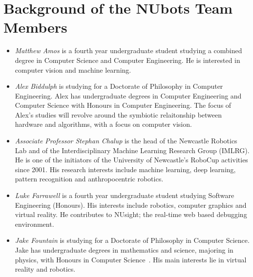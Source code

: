 \documentclass{llncs}
\begin{document}

\section{Background of the NUbots Team Members}

\begin{itemize}


\item \emph{Matthew Amos} is a fourth year undergraduate student studying a combined degree in Computer Science and Computer Engineering. He is interested in computer vision and machine learning.

\item \emph{Alex Biddulph} is studying for a Doctorate of Philosophy in Computer Engineering. Alex has undergraduate degrees in Computer Engineering and Computer Science with Honours in Computer Engineering. The focus of Alex's studies will revolve around the symbiotic relaitonship between hardware and algorithms, with a focus on computer vision.

\item \emph{Associate Professor Stephan Chalup} is the head of the Newcastle Robotics Lab and of the Interdisciplinary Machine Learning Research Group (IMLRG). He is one of the initiators of the University of Newcastle's RoboCup activities since 2001. His research interests include machine learning, deep learning, pattern recognition and anthropocentric robotics.

\item \emph{Luke Farrawell} is a fourth year undergraduate student studying Software Engineering (Honours). His interests include robotics, computer graphics and virtual reality. He contributes to NUsight; the real-time web based debugging environment.

\item \emph{Jake Fountain} is studying for a Doctorate of Philosophy in Computer Science. Jake has undergraduate degrees in mathematics and science, majoring in physics, with Honours in Computer Science~\cite{FountainChalup2015}. His main interests lie in virtual reality and robotics.


\end{itemize}
\end{document}
